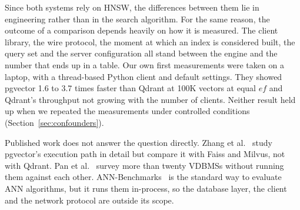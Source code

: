 \documentclass[preprint,12pt]{elsarticle}
\begin{document}
Since both systems rely on HNSW, the differences between them lie in engineering
rather than in the search algorithm. For the same reason, the outcome of a comparison
depends heavily on how it is measured. The client library, the wire protocol, the
moment at which an index is considered built, the query set and the server
configuration all stand between the engine and the number that ends up in a table. Our
own first measurements were taken on a laptop, with a thread-based Python client and
default settings. They showed pgvector 1.6 to 3.7 times faster than Qdrant at 100K vectors
at equal $ef$ and Qdrant's throughput not growing with the number of clients. Neither result held up
when we repeated the measurements under controlled conditions
(Section~\ref{sec:confounders}).

Published work does not answer the question directly. Zhang et al.~\cite{zhang2024}
study pgvector's execution path in detail but compare it with Faiss and Milvus, not with
Qdrant. Pan et al.~\cite{pan2024survey} survey more than twenty VDBMSs without running
them against each other. ANN-Benchmarks~\cite{aumuller2020} is the standard way to
evaluate ANN algorithms, but it runs them in-process, so the database layer, the client
and the network protocol are outside its scope.
\end{document}
